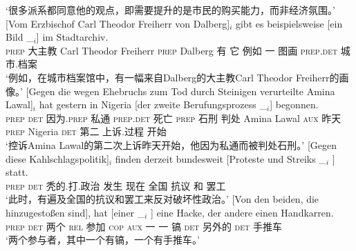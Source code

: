 \begin{sloppypar}
\glt `很多派系都同意他的观点，即需要提升的是市民的购买能力，而非经济氛围。'
\ex\label{bsp-von-erzbischof-bilder} 
\gll {}[Vom Erzbischof Carl Theodor Freiherr von Dalberg]$_i$ gibt es beispielsweise [ein Bild \_$_i$]
        im Stadtarchiv.\footnotemark\\
	{}\spacebr{}\textsc{prep} 大主教 Carl Theodor Freiherr \textsc{prep} Dalberg 有 它 例如 \spacebr{}一 图画 {} \textsc{prep}.\textsc{det} 城市.档案\\
\glt `例如，在城市档案馆中，有一幅来自Dalberg的大主教Carl Theodor Freiherr的画像。'
\ex 
\gll {}[Gegen die wegen Ehebruchs zum Tod durch Steinigen verurteilte Amina Lawal]$_i$ hat gestern in Nigeria
    [der zweite Berufungsprozess \_$_i$] begonnen.\footnotemark\\
	{}\spacebr{}\textsc{prep} \textsc{det} 因为.\textsc{prep} 私通 \textsc{prep}.\textsc{det} 死亡 \textsc{prep} 石刑 判处 Amina Lawal \textsc{aux} 昨天 \textsc{prep} Nigeria \spacebr{}\textsc{det} 第二 上诉.过程 {} 开始\\
\glt `控诉Amina Lawal的第二次上诉昨天开始，他因为私通而被判处石刑。'
\ex 
\gll {}[Gegen                  diese        Kahlschlagspolitik]$_i$ finden derzeit bundesweit                     [Proteste und Streiks \_$_i$ ] statt.\footnotemark\\
     {}\spacebr{}\textsc{prep} \textsc{det} 秃的.打.政治    发生   现在 \spacebr{}全国 \spacebr{}抗议 和 罢工 {} {} \prt{}\\
\glt `此时，有遍及全国的抗议和罢工来反对破坏性政治。'
\ex 
\gll {}[Von den beiden, die hinzugestoßen sind], hat [einer        \_$_i$ ] eine Hacke, der andere einen Handkarren.\footnotemark\\
	 {}\spacebr{}\textsc{prep} \textsc{det} 两个 \textsc{rel} 参加 \textsc{cop} \textsc{aux} \spacebr{}一 {}    {}  一 镐   \textsc{det} 另外的 \textsc{det} 手推车\\
\glt `两个参与者，其中一个有镐，一个有手推车。'

\end{sloppypar}
